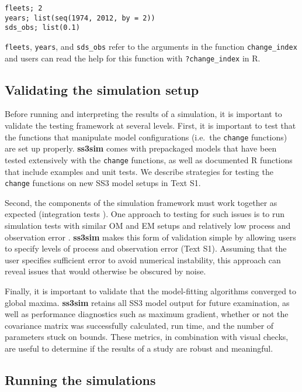 \documentclass[10pt]{article}
\newcommand{\R}[1]{\label{#1}\linelabel{#1}}
\begin{document}
\begin{verbatim}
fleets; 2
years; list(seq(1974, 2012, by = 2))
sds_obs; list(0.1)
\end{verbatim}

\noindent
\texttt{fleets}, \texttt{years}, and \texttt{sds\_obs} refer to the arguments
in the function \texttt{change\_index} and users can read the help for this
function with \texttt{?change\_index} in \textsf{R}.

\subsection*{Validating the simulation setup}

\R{A4:1}Before running and interpreting the results of a simulation, it is
important to validate the testing framework at several levels. First, it is
important to test that the functions that manipulate model configurations
(i.e.~the \texttt{change} functions) are set up properly. \textbf{ss3sim} comes
with prepackaged models that have been tested extensively with the
\texttt{change} functions, as well as documented \textsf{R} functions that
include examples and unit tests. We describe strategies for testing the
\texttt{change} functions on new SS3 model setups in Text S1.

Second, the components of the simulation framework must work together as
expected (integration tests \cite{wilson2014}). One approach to testing for
such issues is to run simulation tests with similar OM and EM setups and
relatively low process and observation error \cite{hilborn1992}.
\textbf{ss3sim} makes this form of validation simple by allowing users to
specify levels of process and observation error (Text S1). \R{A4:2}Assuming
that the user specifies sufficient error to avoid numerical instability, this
approach can reveal issues that would otherwise be obscured by noise.

Finally, it is important to validate that the model-fitting algorithms
converged to global maxima. \textbf{ss3sim} retains all SS3 model output for
future examination, as well as performance diagnostics such as maximum
gradient, whether or not the covariance matrix was successfully calculated, run
time, and the number of parameters stuck on bounds. These metrics, in
combination with visual checks, are useful to determine if the results of a
study are robust and meaningful.

\subsection*{Running the simulations}
\end{document}
